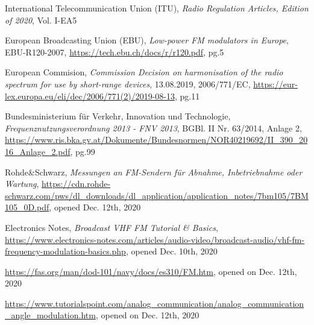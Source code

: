 \documentclass[conference]{IEEEtran}
\begin{document}
%
%
%
\begin{thebibliography}{1}
    International Telecommunication Union (ITU), \emph{Radio Regulation Articles, Edition of 2020}, Vol. I-EA5

    European Broadcasting Union (EBU), \emph{Low-power FM modulators in Europe}, EBU-R120-2007, \url{https://tech.ebu.ch/docs/r/r120.pdf}, pg.5

    European Commision, \emph{Commission Decision on harmonisation of the radio spectrum for use by short-range devices}, 13.08.2019, 2006/771/EC, \url{https://eur-lex.europa.eu/eli/dec/2006/771(2)/2019-08-13}, pg.11

    Bundesministerium für Verkehr, Innovation und Technologie, \emph{Frequenznutzungsverordnung 2013 - FNV 2013}, BGBl. II Nr. 63/2014, Anlage 2, \url{https://www.ris.bka.gv.at/Dokumente/Bundesnormen/NOR40219692/II_390_2016_Anlage_2.pdf}, pg.99

  Rohde\&Schwarz, \emph{Messungen an FM-Sendern für Abnahme, Inbetriebnahme oder Wartung}, \url{https://cdn.rohde-schwarz.com/pws/dl_downloads/dl_application/application_notes/7bm105/7BM105_0D.pdf}, opened Dec. 12th, 2020

    Electronics Notes, \emph{Broadcast VHF FM Tutorial \& Basics}, \url{https://www.electronics-notes.com/articles/audio-video/broadcast-audio/vhf-fm-frequency-modulation-basics.php}, opened Dec. 10th, 2020

    \url{https://fas.org/man/dod-101/navy/docs/es310/FM.htm}, opened on Dec. 12th, 2020

    \url{https://www.tutorialspoint.com/analog_communication/analog_communication_angle_modulation.htm}, opened on Dec. 12th, 2020


\end{thebibliography}
\end{document}
